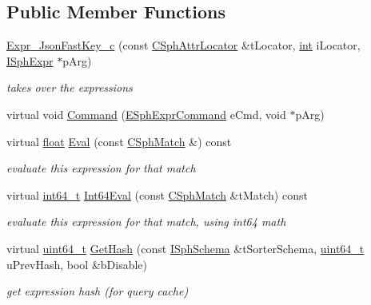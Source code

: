 \subsection*{Public Member Functions}
\begin{DoxyCompactItemize}
\item 
\hyperlink{structExpr__JsonFastKey__c_ae8d1ecff55bb809f08dea491d93c1a81}{Expr\-\_\-\-Json\-Fast\-Key\-\_\-c} (const \hyperlink{structCSphAttrLocator}{C\-Sph\-Attr\-Locator} \&t\-Locator, \hyperlink{sphinxexpr_8cpp_a4a26e8f9cb8b736e0c4cbf4d16de985e}{int} i\-Locator, \hyperlink{structISphExpr}{I\-Sph\-Expr} $\ast$p\-Arg)
\begin{DoxyCompactList}\small\item\em takes over the expressions \end{DoxyCompactList}\item 
virtual void \hyperlink{structExpr__JsonFastKey__c_a11b5d7820da18d8b0bdfdb001d10e391}{Command} (\hyperlink{sphinxexpr_8h_a30be184fb07bd80c271360fc6094c818}{E\-Sph\-Expr\-Command} e\-Cmd, void $\ast$p\-Arg)
\item 
virtual \hyperlink{sphinxexpr_8cpp_a0e0d0739f7035f18f949c2db2c6759ec}{float} \hyperlink{structExpr__JsonFastKey__c_a8a603fe088de65ecd7a98fe1ac3ed096}{Eval} (const \hyperlink{classCSphMatch}{C\-Sph\-Match} \&) const 
\begin{DoxyCompactList}\small\item\em evaluate this expression for that match \end{DoxyCompactList}\item 
virtual \hyperlink{sphinxstd_8h_a996e72f71b11a5bb8b3b7b6936b1516d}{int64\-\_\-t} \hyperlink{structExpr__JsonFastKey__c_a72bc43aa035408743f5dfbba05a0815f}{Int64\-Eval} (const \hyperlink{classCSphMatch}{C\-Sph\-Match} \&t\-Match) const 
\begin{DoxyCompactList}\small\item\em evaluate this expression for that match, using int64 math \end{DoxyCompactList}\item 
virtual \hyperlink{sphinxstd_8h_aaa5d1cd013383c889537491c3cfd9aad}{uint64\-\_\-t} \hyperlink{structExpr__JsonFastKey__c_a272d3498a9a833ba8901d9b54fdb2d0f}{Get\-Hash} (const \hyperlink{classISphSchema}{I\-Sph\-Schema} \&t\-Sorter\-Schema, \hyperlink{sphinxstd_8h_aaa5d1cd013383c889537491c3cfd9aad}{uint64\-\_\-t} u\-Prev\-Hash, bool \&b\-Disable)
\begin{DoxyCompactList}\small\item\em get expression hash (for query cache) \end{DoxyCompactList}\end{DoxyCompactItemize}
